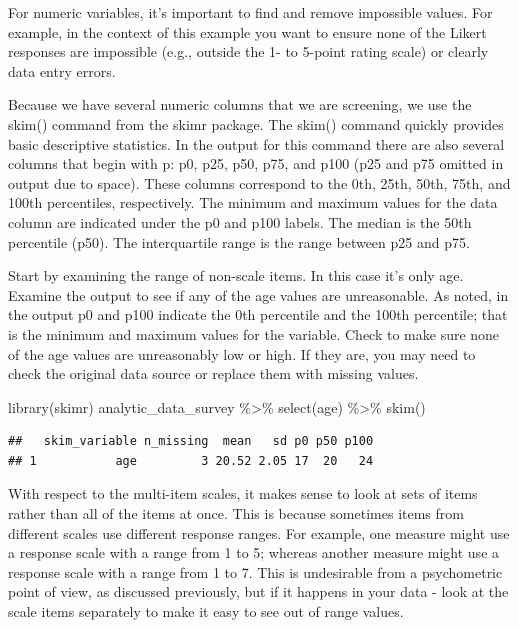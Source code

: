 \documentclass[
]{krantz}
\makeatletter
\newenvironment{Shaded}{\begin{snugshade}}{\end{snugshade}}
\newcommand{\FunctionTok}[1]{\textcolor[rgb]{0,0,0}{#1}}
\newcommand{\NormalTok}[1]{#1}
\newcommand{\SpecialCharTok}[1]{\textcolor[rgb]{0,0,0}{#1}}
\newenvironment{kframe}{%
\medskip{}
\setlength{\fboxsep}{.8em}
 \def\at@end@of@kframe{}%
 \ifinner\ifhmode%
  \def\at@end@of@kframe{\end{minipage}}%
  \begin{minipage}{\columnwidth}%
 \fi\fi%
 \def\FrameCommand##1{\hskip\@totalleftmargin \hskip-\fboxsep
 \colorbox{shadecolor}{##1}\hskip-\fboxsep
     \hskip-\linewidth \hskip-\@totalleftmargin \hskip\columnwidth}%
 \MakeFramed {\advance\hsize-\width
   \@totalleftmargin\z@ \linewidth\hsize
   \@setminipage}}%
 {\par\unskip\endMakeFramed%
 \at@end@of@kframe}
\renewenvironment{Shaded}{\begin{kframe}}{\end{kframe}}
\makeatother
\begin{document}
For numeric variables, it's important to find and remove impossible values. For example, in the context of this example you want to ensure none of the Likert responses are impossible (e.g., outside the 1- to 5-point rating scale) or clearly data entry errors.

Because we have several numeric columns that we are screening, we use the skim() command from the skimr package. The skim() command quickly provides basic descriptive statistics. In the output for this command there are also several columns that begin with p: p0, p25, p50, p75, and p100 (p25 and p75 omitted in output due to space). These columns correspond to the 0th, 25th, 50th, 75th, and 100th percentiles, respectively. The minimum and maximum values for the data column are indicated under the p0 and p100 labels. The median is the 50th percentile (p50). The interquartile range is the range between p25 and p75.

Start by examining the range of non-scale items. In this case it's only age. Examine the output to see if any of the age values are unreasonable. As noted, in the output p0 and p100 indicate the 0th percentile and the 100th percentile; that is the minimum and maximum values for the variable. Check to make sure none of the age values are unreasonably low or high. If they are, you may need to check the original data source or replace them with missing values.

\begin{Shaded}
\begin{Highlighting}[]
\FunctionTok{library}\NormalTok{(skimr)}
\NormalTok{analytic\_data\_survey }\SpecialCharTok{\%\textgreater{}\%}
  \FunctionTok{select}\NormalTok{(age) }\SpecialCharTok{\%\textgreater{}\%}
  \FunctionTok{skim}\NormalTok{()}
\end{Highlighting}
\end{Shaded}

\begin{verbatim}
##   skim_variable n_missing  mean   sd p0 p50 p100
## 1           age         3 20.52 2.05 17  20   24
\end{verbatim}

With respect to the multi-item scales, it makes sense to look at sets of items rather than all of the items at once. This is because sometimes items from different scales use different response ranges. For example, one measure might use a response scale with a range from 1 to 5; whereas another measure might use a response scale with a range from 1 to 7. This is undesirable from a psychometric point of view, as discussed previously, but if it happens in your data - look at the scale items separately to make it easy to see out of range values.
\end{document}
